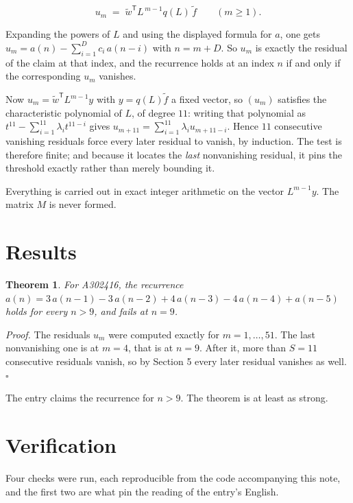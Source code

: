 \documentclass[11pt]{article}
\newtheorem{theorem}{Theorem}
\theoremstyle{definition}
\begin{document}
\[u_m \;=\; \tilde w^{\mathsf T} L^{\,m-1} q(L)\,\tilde f \qquad (m \ge 1).\]

Expanding the powers of $L$ and using the displayed formula for $a$, one gets $u_m = a(n) - \sum_{i=1}^{D} c_i\,a(n-i)$ with $n = m + D$. So $u_m$ is exactly the residual of the claim at that index, and the recurrence holds at an index $n$ if and only if the corresponding $u_m$ vanishes.

Now $u_m = \tilde w^{\mathsf T} L^{m-1} y$ with $y = q(L)\tilde f$ a fixed vector, so $(u_m)$ satisfies the characteristic polynomial of $L$, of degree $11$: writing that polynomial as $t^{11} - \sum_{i=1}^{11} \lambda_i t^{11-i}$ gives $u_{m+11} = \sum_{i=1}^{11} \lambda_i u_{m+11-i}$. Hence $11$ consecutive vanishing residuals force every later residual to vanish, by induction. The test is therefore finite; and because it locates the {\itshape last} nonvanishing residual, it pins the threshold exactly rather than merely bounding it.

Everything is carried out in exact integer arithmetic on the vector $L^{m-1}y$. The matrix $M$ is never formed.

\section{Results}

\begin{theorem} For A302416, the recurrence $a(n) = 3\,a(n-1) - 3\,a(n-2) + 4\,a(n-3) - 4\,a(n-4) + a(n-5)$ holds for every $n > 9$, and fails at $n = 9$.\end{theorem}

{\itshape Proof.} The residuals $u_m$ were computed exactly for $m = 1,\dots,51$. The last nonvanishing one is at $m = 4$, that is at $n = 9$. After it, more than $S = 11$ consecutive residuals vanish, so by Section 5 every later residual vanishes as well. $\square$

The entry claims the recurrence for $n > 9$. The theorem is at least as strong.

\section{Verification}

Four checks were run, each reproducible from the code accompanying this note, and the first two are what pin the reading of the entry's English.
\end{document}
